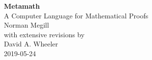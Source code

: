 \begin{center}
{\LARGE\bf Metamath} \\
\vspace{1ex}
{\large A Computer Language for Mathematical Proofs} \\
\vspace{7ex}
{\large Norman Megill} \\
\vspace{7ex}
with extensive revisions by \\
\vspace{1ex}
{\large David A. Wheeler} \\
\vspace{7ex}
2019-05-24
\end{center}

\vfill
\hfill

\newpage
\thispagestyle{empty}

\hfill
\vfill

